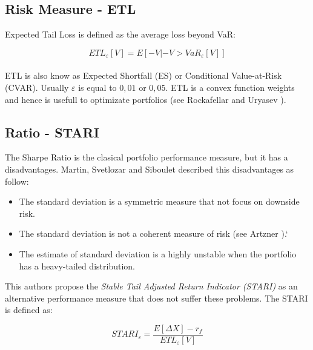 \documentclass[12pt]{article}
\begin{document}

\subsection{Risk Measure - ETL}

Expected Tail Loss is defined as the average loss beyond VaR:

\begin{equation}
ETL_{\varepsilon}[V]=E[-V | -V > VaR_{\varepsilon}[V]]
\label{eq_ETL_1}
\end{equation}\\


ETL is also know as Expected Shortfall (ES) or Conditional Value-at-Risk (CVAR). Usually $\varepsilon$ is equal to $0,01$ or $0,05$. ETL is a convex function weights and hence is usefull to optimizate portfolios (see Rockafellar and Uryasev \cite{RockafellarUryasev}).



\subsection{Ratio - STARI}

The Sharpe Ratio is the clasical portfolio performance measure, but it has a disadvantages. Martin, Svetlozar and Siboulet \cite{Martin_Rachev_Siboulet}  described this disadvantages as follow:




\begin{itemize}
\item The standard deviation is a symmetric measure that not focus on downside risk.
\item The standard deviation is not a coherent measure of risk (see Artzner \cite{Artzner_Delbean}).`
\item The estimate of standard deviation is a highly unstable when the portfolio has a heavy-tailed distribution.
\end{itemize}


This authors propose the \textit{Stable Tail Adjusted Return Indicator (STARI)} as an alternative performance measure that does not suffer these problems.  The STARI is defined as:
 
\begin{equation}
STARI_{\varepsilon}=\dfrac{E[ \Delta X]-r_{f}}{ETL_{\varepsilon}[V]}
\label{eq_STARI_e}
\end{equation}\\
\end{document}
